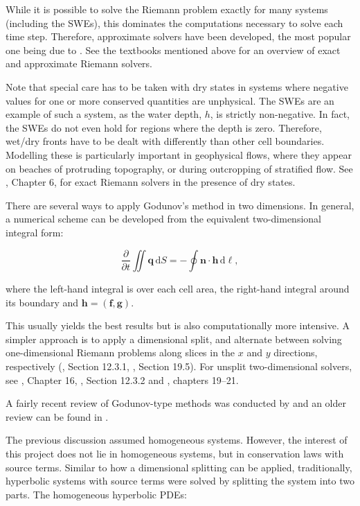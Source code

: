 \documentclass[a4paper,onecolumn,11pt]{article}
\renewcommand{\vec}[1]{\ensuremath{\mathbf{#1}}}
\newcommand{\dif}{\mathrm{d}}
\begin{document}
While it is possible to solve the Riemann problem exactly for many systems (including the SWEs), this dominates the computations necessary to solve each time step. Therefore, approximate solvers have been developed, the most popular one being due to \citet{roe1981approximate}. See the textbooks mentioned above for an overview of exact and approximate Riemann solvers.

Note that special care has to be taken with dry states in systems where negative values for one or more conserved quantities are unphysical. The SWEs are an example of such a system, as the water depth, $h$, is strictly non-negative. In fact, the SWEs do not even hold for regions where the depth is zero. Therefore, wet/dry fronts have to be dealt with differently than other cell boundaries. Modelling these is particularly important in geophysical flows, where they appear on beaches of protruding topography, or during outcropping of stratified flow. See \citet{toro2001shock}, Chapter 6, for exact Riemann solvers in the presence of dry states.

There are several ways to apply Godunov's method in two dimensions. In general, a numerical scheme can be developed from the equivalent two-dimensional integral form:

$$
    \frac{\partial}{\partial t} \iint \vec{q}\,\dif S = - \oint \vec{n} \cdot \vec{h}\,\dif \ell,
$$

where the left-hand integral is over each cell area, the right-hand integral around its boundary and $\vec{h} = (\vec{f}, \vec{g})$.

This usually yields the best results but is also computationally more intensive. A simpler approach is to apply a dimensional split, and alternate between solving one-dimensional Riemann problems along slices in the $x$ and $y$ directions, respectively (\citet{toro2001shock}, Section 12.3.1, \citet{leveque2002finite}, Section 19.5). For unsplit two-dimensional solvers, see \citet{toro1999riemann}, Chapter 16, \citet{toro2001shock}, Section 12.3.2 and \citet{leveque2002finite}, chapters 19--21.

A fairly recent review of Godunov-type methods was conducted by \citet{toro2007godunov} and an older review can be found in \citet{sweby2001godunov}.

The previous discussion assumed homogeneous systems. However, the interest of this project does not lie in homogeneous systems, but in conservation laws with source terms. Similar to how a dimensional splitting can be applied, traditionally, hyperbolic systems with source terms were solved by splitting the system into two parts. The homogeneous hyperbolic PDEs:
\end{document}

